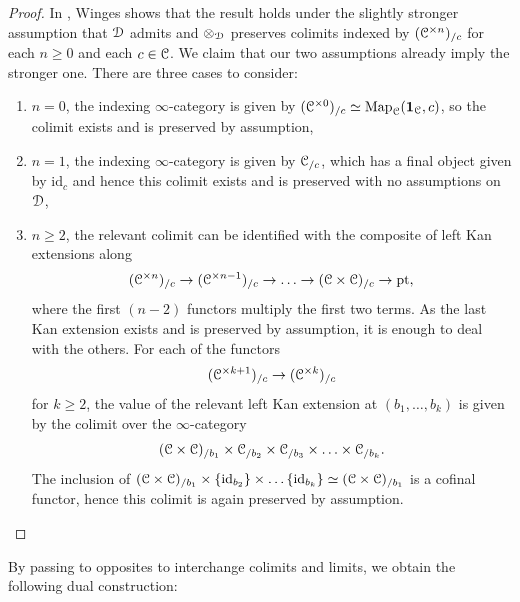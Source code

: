 \documentclass[oneside,a4paper]{amsart}
\begin{document}
\begin{proof}
In \cite[{Proposition 4.1}]{winges2026hinich}, Winges shows that the result holds under the slightly stronger assumption that $\EuScript{D}$ admits and $\otimes_{\EuScript{D}}$ preserves colimits indexed by $(\EuScript{C}^{\times n})_{/c}$ for each $n \geq 0$ and each $c \in \EuScript{C}$. We claim that our two assumptions already imply the stronger one. There are three cases to consider:
\begin{enumerate}
    \item $n = 0$, the indexing $\infty$-category is given by $(\EuScript{C}^{\times 0})_{/c} \simeq \mathrm{Map}_{\EuScript{C}}(\mathbf{1}_{\EuScript{C}}, c)$, so the colimit exists and is preserved by assumption, 
    \item $n = 1$, the indexing $\infty$-category is given by $\EuScript{C}_{/c}$, which has a final object given by $\mathrm{id}_{c}$ and hence this colimit exists and is preserved with no assumptions on $\EuScript{D}$, 
    \item $n \geq 2$, the relevant colimit can be identified with the composite of left Kan extensions along 
    \[
    (\EuScript{C}^{\times n})_{/c} \rightarrow (\EuScript{C}^{\times n-1})_{/c} \rightarrow \ldots \rightarrow (\EuScript{C} \times \EuScript{C})_{/c} \rightarrow \mathrm{pt},
    \]
where the first $(n-2)$ functors multiply the first two terms. As the last Kan extension exists and is preserved by assumption, it is enough to deal with the others. For each of the functors
\[
(\EuScript{C}^{\times k+1})_{/c} \rightarrow (\EuScript{C}^{\times k})_{/c}  
\]
for $k \geq 2$, the value of the relevant left Kan extension at $(b_{1}, \ldots, b_{k})$ is given by the colimit over the $\infty$-category
\[
(\EuScript{C} \times \EuScript{C})_{/b_{1}} \times \EuScript{C}_{/b_{2}} \times \EuScript{C}_{/b_{3}} \times \ldots \times \EuScript{C}_{/b_{k}}. 
\]
The inclusion of $(\EuScript{C} \times \EuScript{C})_{/b_{1}} \times \{ \mathrm{id}_{b_{2}} \} \times \ldots \{ \mathrm{id}_{b_{k}} \} \simeq (\EuScript{C} \times \EuScript{C})_{/b_{1}}$ is a cofinal functor, hence this colimit is again preserved by assumption. 
\end{enumerate}
\end{proof}

By passing to opposites to interchange colimits and limits, we obtain the following dual construction:
\end{document}
